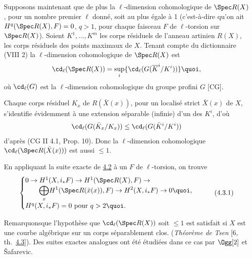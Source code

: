 \documentclass[10pt]{../fichiers-configuration-latex/smfart}
\begin{document}
\setcounter{subsection}{2}
\subsection{}
Supposons maintenant que de plus la $\ell$-dimension cohomologique de
$\Spec R(X)$, pour un nombre premier $\ell$ donné, soit au plus égale
à 1 (c'est-à-dire qu'on ait $H^q(\Spec R(X), F)=0$, $q>1$, pour chaque
faisceau $F$ de $\ell$-torsion sur $\Spec R(X)$). Soient
$K^1,\ldots,K^m$ les corps résiduels de l'anneau artinien $R(X)$, \ie
les corps résiduels des points maximaux de $X$. Tenant compte du
dictionnaire (VIII 2) la $\ell$-dimension cohomologique de $\Spec
R(X)$ est
$$
\cd_{\ell}(\Spec R(X))=\mathop{\sup}_i \{\cd_{\ell}
(G(\overline{K}^{i}/K^{i}))\}{\quoi},
$$
où $\cd_{\ell}(G)$ est la $\ell$-dimension cohomologique du groupe
profini $G$ [\cf CG].

Chaque corps résiduel $K_x$ de $R(\bar{X}(x))$, pour un localisé
strict $\bar{X}(x)$ de $X$, s'identifie évidemment à une extension
séparable (infinie) d'un des $K^i$, d'où
$$
\cd_{\ell}(G(\bar{K}_x/K_x))\leq \cd_{\ell} (G(\bar{K}^i/K^i))
$$
d'après (CG II 4.1, Prop. 10). Donc la $\ell$-dimension cohomologique
$\cd_{\ell}(\Spec R(\bar{X}(x)))$ est aussi $\leq 1$.

En appliquant la suite exacte de \hyperref[IX.cor4.2]{4.2} à un $F$ de $\ell$-torsion, on
trouve
\begin{equation*}
\begin{cases}
 0\rightarrow H^1(X,i_{\ast}F)\rightarrow H^1(\Spec
R(X), F)\rightarrow\\
\qquad \displaystyle{\bigoplus_x} H^1(\Spec R(\bar{x}(x)),F)\rightarrow
H^2(X,i_{\ast}F)\rightarrow 0{\quoi},\\
 H^q(X,i_{\ast}F)=0\mbox{ pour } q> 2{\quoi}.
\end{cases}\tag{4.3.1}
\end{equation*}

Remarquons\pageoriginale que l'hypothèse que $\cd_{\ell}(\Spec R(X))$
soit $\leq 1$
est satisfait si $X$ est une courbe algébrique sur un corps
séparablement clos. (\emph{Théorème de Tsen} [6, th.~\hyperref[IX.subsec4.3]{4.3}]). Des suites
exactes analogues ont été étudiées dans ce cas par $\Ogg[2]$ et
\v{S}afarevic.
\end{document}
